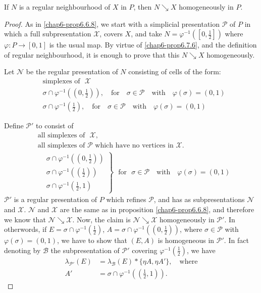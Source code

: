 \begin{proposition}\label{chap6-prop6.7.7}
If $N$ is a regular neighbourhood of $X$ in $P$, then $N\searrow X$ homogeneously in $P$.
\end{proposition}

\begin{proof}
As in \ref{chap6-prop6.6.8}, we start with a simplicial presentation $\mathscr{P}$ of $P$ in which a full subpresentation $\mathscr{X}$, covers $X$, and take $N=\varphi^{-1}([0,\frac{1}{2}])$ where $\varphi:P\to [0,1]$ is the usual map. By virtue of \ref{chap6-prop6.7.6}, and the definition of regular neighbourhood, it is enough to prove that this $N\searrow X$ homogeneously.

Let $\mathscr{N}$ be the regular presentation of $N$ consisting of cells of the form:
\begin{align*}
& \text{simplexes of~ }\mathscr{X}\\
& \sigma\cap \varphi^{-1}((0,\frac{1}{2})),\quad\text{for}\quad \sigma\in \mathscr{P}\quad\text{with}\quad \varphi(\sigma)=(0,1)\\
& \sigma\cap \varphi^{-1}(\frac{1}{2}),\quad\text{for}\quad \sigma\in \mathscr{P}\quad\text{with}\quad \varphi(\sigma)=(0,1)
\end{align*}

Define $\mathscr{P}'$ to consist of
\begin{align*}
&\text{all simplexes of~ }\mathscr{X},\\
&\text{all simplexes of $\mathscr{P}$ which have no vertices in } \mathscr{X}.\\
& \left.
 \begin{aligned}
&\sigma\cap \varphi^{-1}((0,\frac{1}{2}))\\
 &\sigma\cap \varphi^{-1}((\frac{1}{2}))\\
&\sigma\cap \varphi^{-1}(\frac{1}{2},1)
  \end{aligned} \right\}
\text{~ for~ } \sigma\in \mathscr{P}\quad\text{with}\quad \varphi(\sigma)=(0,1)
\end{align*}\pageoriginale
$\mathscr{P}'$ is a regular presentation of $P$ which refines $\mathscr{P}$, and has as subpresentations $\mathscr{N}$ and $\mathscr{X}$. $\mathscr{N}$ and $\mathscr{X}$ are the same as in proposition \ref{chap6-prop6.6.8}, and therefore we know that $\mathscr{N}\searrow \mathscr{X}$. Now, the claim is $\mathscr{N}\searrow \mathscr{X}$ homogeneously in $\mathscr{P}'$. In otherwords, if $E=\sigma\cap \varphi^{-1}(\frac{1}{2})$, $A=\sigma\cap \varphi^{-1}((0,\frac{1}{2}))$, where $\sigma\in\mathscr{P}$ with $\varphi(\sigma)=(0,1)$, we have to show that $(E,A)$ is homogeneous in $\mathscr{P}'$. In fact denoting by $\mathscr{B}$ the subpresentation of $\mathscr{P}'$ covering $\varphi^{-1}(\frac{1}{2})$, we have
\begin{align*}
\lambda_{\mathscr{P}'}(E) &= \lambda_{\mathscr{B}}(E)\ast \{\eta A,\eta A'\},\quad\text{where}\\
A' &= \sigma\cap \varphi^{-1}((\frac{1}{2},1)).
\end{align*}
\end{proof}

